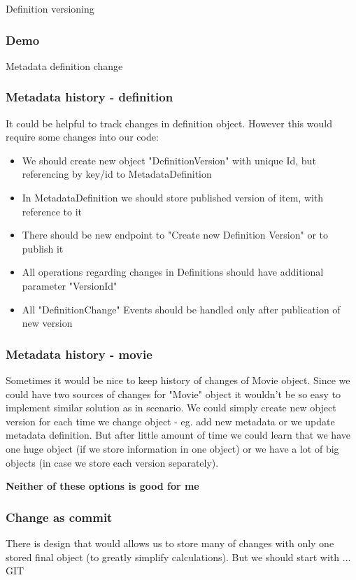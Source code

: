 \documentclass{beamer}
\begin{document}
\begin{section}{Definition versioning}
\begin{frame}
\end{frame}

\begin{frame}
\frametitle{Demo}
Metadata definition change
\end{frame}

\begin{frame}
\frametitle{Metadata history - definition}
It could be helpful to track changes in definition object. However this would require some changes into our code:
\begin{itemize}
	\item We should create new object "DefinitionVersion" with unique Id, but referencing by key/id to MetadataDefinition
	\item In MetadataDefinition we should store published version of item, with reference to it
	\item There should be new endpoint to "Create new Definition Version" or to publish it
	\item All operations regarding changes in Definitions should have additional parameter "VersionId"
	\item All "DefinitionChange" Events should be handled only after publication of new version
\end{itemize}
\end{frame}

\begin{frame}
\frametitle{Metadata history - movie}
Sometimes it would be nice to keep history of changes of Movie object. Since we could have two sources of changes for "Movie" object it wouldn't be so easy to implement similar solution as in scenario. We could simply create new object version for each time we change object - eg. add new metadata or we update metadata definition. But after little amount of time we could learn that we have one huge object (if we store information in one object) or we have a lot of big objects (in case we store each version separately).
\newline
\begin{center}
	\textbf{Neither of these options is good for me}
\end{center}
\end{frame}

\begin{frame}
\frametitle{Change as commit}
There is design that would allows us to store many of changes with only one stored final object (to greatly simplify calculations). \newline
But we should start with  ...  GIT


\end{frame}
\end{section}
\end{document}
